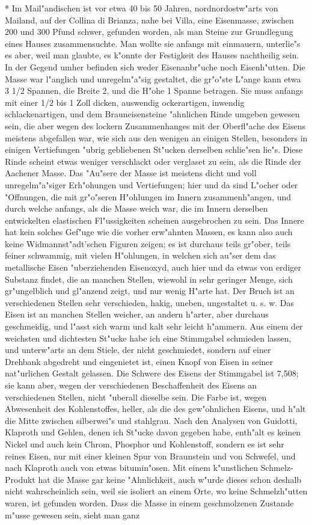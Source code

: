 \documentclass[a4paper, 11pt, oneside, polutonikogreek, german]{article}
\begin{document}
* Im Mail"andischen ist vor etwa 40 bis 50 Jahren, nordnordostw"arts von Mailand, auf der Collina di Brianza, nahe bei Villa, eine Eisenmasse, zwischen 200 und 300 Pfund schwer, gefunden worden, als man Steine zur Grundlegung eines Hauses zusammensuchte. Man wollte sie anfangs mit einmauern, unterlie"s es aber, weil man glaubte, es k"onnte der Festigkeit des Hauses nachtheilig sein. In der Gegend umher befinden sich weder Eisenanbr"uche noch Eisenh"utten. Die Masse war l"anglich und unregelm"a"sig gestaltet, die gr"o"ste L"ange kann etwa 3 1/2 Spannen, die Breite 2, und die H"ohe 1 Spanne betragen. Sie muss anfangs mit einer 1/2 bis 1 Zoll dicken, auswendig ockerartigen, inwendig schlackenartigen, und dem Brauneisensteine "ahnlichen Rinde umgeben gewesen sein, die aber wegen des lockern Zusammenhanges mit der Oberfl"ache des Eisens meistens abgefallen war, wie sich aus den wenigen an einigen Stellen, besonders in einigen Vertiefungen "ubrig gebliebenen St"ucken derselben schlie"sen lie"s. Diese Rinde scheint etwas weniger verschlackt oder verglaset zu sein, als die Rinde der Aachener Masse. Das "Au"sere der Masse ist meistens dicht und voll unregelm"a"siger Erh"ohungen und Vertiefungen; hier und da sind L"ocher oder "Offnungen, die mit gr"o"seren H"ohlungen im Innern zusammenh"angen, und durch welche anfangs, als die Masse weich war, die im Innern derselben entwickelten elastischen Fl"ussigkeiten scheinen ausgebrochen zu sein. Das Innere hat kein solches Gef"uge wie die vorher erw"ahnten Massen, es kann also auch keine Widmannst"adt'schen Figuren zeigen; es ist durchaus teils gr"ober, teils feiner schwammig, mit vielen H"ohlungen, in welchen sich au"ser dem das metallische Eisen "uberziehenden Eisenoxyd, auch hier und da etwas von erdiger Substanz findet, die an manchen Stellen, wiewohl in sehr geringer Menge, sich gr"ungelblich und gl"anzend zeigt, und nur wenig H"arte hat. Der Bruch ist an verschiedenen Stellen sehr verschieden, hakig, uneben, ungestaltet u. s. w. Das Eisen ist an manchen Stellen weicher, an andern h"arter, aber durchaus geschmeidig, und l"asst sich warm und kalt sehr leicht h"ammern. Aus einem der weichsten und dichtesten St"ucke habe ich eine Stimmgabel schmieden lassen, und unterw"arts an dem Stiele, der nicht geschmiedet, sondern auf einer Drehbank abgedreht und eingenietet ist, einen Knopf von Eisen in seiner nat"urlichen Gestalt gelassen. Die Schwere des Eisens der Stimmgabel ist 7,508; sie kann aber, wegen der verschiedenen Beschaffenheit des Eisens an verschiedenen Stellen, nicht "uberall dieselbe sein. Die Farbe ist, wegen Abwesenheit des Kohlenstoffes, heller, als die des gew"ohnlichen Eisens, und h"alt die Mitte zwischen silberwei"s und stahlgrau. Nach den Analysen von Guidotti, Klaproth und Gehlen, denen ich St"ucke davon gegeben habe, enth"alt es keinen Nickel und auch kein Chrom, Phosphor und Kohlenstoff, sondern es ist sehr reines Eisen, nur mit einer kleinen Spur von Braunstein und von Schwefel, und nach Klaproth auch von etwas bitumin"osen. Mit einem k"unstlichen Schmelz-Produkt hat die Masse gar keine "Ahnlichkeit, auch w"urde dieses schon deshalb nicht wahrscheinlich sein, weil sie isoliert an einem Orte, wo keine Schmelzh"utten waren, ist gefunden worden. Dass die Masse in einem geschmolzenen Zustande m"usse gewesen sein, sieht man ganz 
\end{document}
